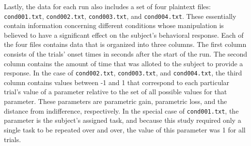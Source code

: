 \par \indent Lastly, the data for each run also includes a set of four plaintext
files: \texttt{cond001.txt}, \texttt{cond002.txt}, \texttt{cond003.txt}, and
\texttt{cond004.txt}. These essentially contain information concerning different
conditions whose manipulation is believed to have a significant effect on the
subject's behavioral response. Each of the four files contains data that is
organized into three columns. The first column consists of the trials' onset
times in seconds after the start of the run. The second column contains the
amount of time that was alloted to the subject to provide a response. In the
case of \texttt{cond002.txt}, \texttt{cond003.txt}, and \texttt{cond004.txt},
the third column contains values between -1 and 1 that correspond to each
particular trial's value of a parameter relative to the set of all possible
values for that parameter. These parameters are parametric gain, parametric
loss, and the distance from indifference, respectively. In the special case of
\texttt{cond001.txt}, the parameter is the subject's assigned task, and because
this study required only a single task to be repeated over and over, the value
of this parameter was 1 for all trials.
